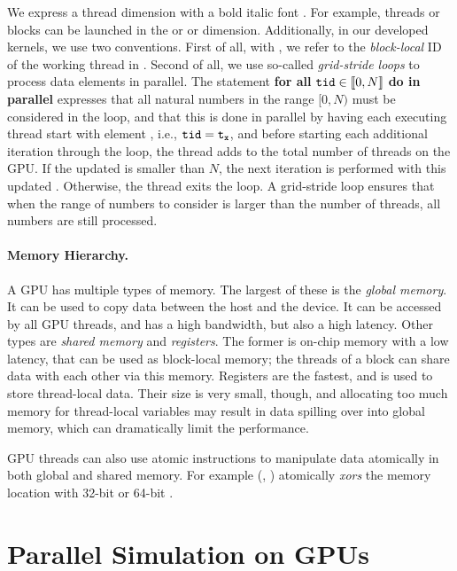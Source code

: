 \documentclass[runningheads]{llncs}
\begin{document}
We express a thread dimension with a bold italic font . For example, threads or blocks can be launched in the  or  or  dimension. Additionally, in our developed kernels, we use two conventions. First of all, with \tx, we refer to the \emph{block-local} ID of the working thread in . Second of all, we use so-called \emph{grid-stride loops} to process data elements in parallel. The statement \textbf{for all} $\texttt{tid} \in \llbracket 0, N \rrbracket$ \textbf{do in parallel} expresses that all natural numbers in the range $[0,N)$ must be considered in the loop, and that this is done in parallel by having each executing thread start with element \tx, i.e., $\texttt{tid} = \texttt{t}_{\textbf{\texttt{x}}}$, and before starting each additional iteration through the loop, the thread adds to \tid the total number of threads on the GPU. If the updated \tid is smaller than $N$, the next iteration is performed with this updated \tid. Otherwise, the thread exits the loop. A grid-stride loop ensures that when the range of numbers to consider is larger than the number of threads, all numbers are still processed.

\paragraph{Memory Hierarchy.}
A GPU has multiple types of memory. The largest of these is the \textit{global memory}. It can be used to copy data between the host and the device. It can be accessed by all GPU threads, and has a high bandwidth, but also a high latency. Other types are \emph{shared memory} and \emph{registers}. The former is on-chip memory with a low latency, that can be used as block-local memory; the threads of a block can share data with each other via this memory. Registers are the fastest, and is used to store thread-local data. Their size is very small, though, and allocating too much memory for thread-local variables may result in data spilling over into global memory, which can dramatically limit the performance.

GPU threads can also use atomic instructions to manipulate data atomically in both global and shared memory. For example \atomicXOR(, ) atomically \emph{xors} the memory location  with 32-bit or 64-bit . 

\section{Parallel Simulation on GPUs}
\end{document}
